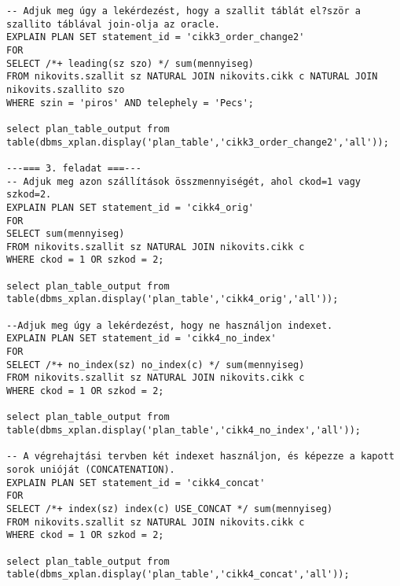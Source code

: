\documentclass[a4paper,11.5pt, table]{article}
\begin{document}
\begin{lstlisting}
-- Adjuk meg úgy a lekérdezést, hogy a szallit táblát el?ször a szallito táblával join-olja az oracle.
EXPLAIN PLAN SET statement_id = 'cikk3_order_change2'
FOR
SELECT /*+ leading(sz szo) */ sum(mennyiseg)
FROM nikovits.szallit sz NATURAL JOIN nikovits.cikk c NATURAL JOIN nikovits.szallito szo
WHERE szin = 'piros' AND telephely = 'Pecs';

select plan_table_output from table(dbms_xplan.display('plan_table','cikk3_order_change2','all')); 

---=== 3. feladat ===---
-- Adjuk meg azon szállítások összmennyiségét, ahol ckod=1 vagy szkod=2.
EXPLAIN PLAN SET statement_id = 'cikk4_orig'
FOR
SELECT sum(mennyiseg)
FROM nikovits.szallit sz NATURAL JOIN nikovits.cikk c
WHERE ckod = 1 OR szkod = 2;

select plan_table_output from table(dbms_xplan.display('plan_table','cikk4_orig','all')); 

--Adjuk meg úgy a lekérdezést, hogy ne használjon indexet.
EXPLAIN PLAN SET statement_id = 'cikk4_no_index'
FOR
SELECT /*+ no_index(sz) no_index(c) */ sum(mennyiseg)
FROM nikovits.szallit sz NATURAL JOIN nikovits.cikk c
WHERE ckod = 1 OR szkod = 2;

select plan_table_output from table(dbms_xplan.display('plan_table','cikk4_no_index','all'));

-- A végrehajtási tervben két indexet használjon, és képezze a kapott sorok unióját (CONCATENATION).
EXPLAIN PLAN SET statement_id = 'cikk4_concat'
FOR
SELECT /*+ index(sz) index(c) USE_CONCAT */ sum(mennyiseg)
FROM nikovits.szallit sz NATURAL JOIN nikovits.cikk c
WHERE ckod = 1 OR szkod = 2;

select plan_table_output from table(dbms_xplan.display('plan_table','cikk4_concat','all'));

\end{lstlisting}
\end{document}
